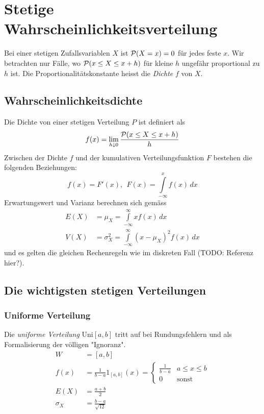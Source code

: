\chapter{Stetige Wahrscheinlichkeitsverteilung}
Bei einer stetigen Zufallsvariablen $X$ ist $\mathcal P(X=x)=0$ für jedes feste $x$. Wir betrachten nur Fälle, wo $\mathcal P(x\leq X\leq x+h)$ für kleine $h$ ungefähr proportional zu $h$ ist. Die Proportionalitätskonstante heisst die \emph{Dichte} $f$ von $X$.
%
\section{Wahrscheinlichkeitsdichte}
Die Dichte von einer stetigen Verteilung $P$ ist definiert als
\begin{equation}
	f(x) = \lim\limits_{h\downarrow 0}\frac{\mathcal P(x\leq X\leq x+h)}{h}
\end{equation}
Zwischen der Dichte $f$ und der kumulativen Verteilungsfunktion $F$ bestehen die folgenden Beziehungen:
\begin{equation}
	f(x) = F'(x), \ \ F(x) = \int\limits_{-\infty}^x f(x) \, dx
\end{equation}
Erwartungswert und Varianz berechnen sich gemäss
\begin{align}
	E(X) &= \mu_X = \int\limits_{-\infty}^\infty xf(x)\,dx \\
	V(X) &= \sigma^2_X = \int\limits_{-\infty}^\infty (x-\mu_X)^2f(x)\,dx
\end{align}
und es gelten die gleichen Rechenregeln wie im diskreten Fall (TODO: Referenz hier?).
%
\section{Die wichtigsten stetigen Verteilungen}
\subsection{Uniforme Verteilung}
Die \emph{uniforme Verteilung} $\text{Uni}[a,b]$ tritt auf bei Rundungsfehlern und als Formalisierung der völligen "Ignoranz".
\begin{align}
	W&=[a,b]\\
	f(x)&=\frac{1}{b-a}1_{[a,b]}(x)=
	\begin{cases}
		\frac{1}{b-a} & a\leq x \leq b \\
		0 & \text{sonst}
	\end{cases}\\
	E(X)&=\frac{a+b}{2}\\
	\sigma_X&=\frac{b-a}{\sqrt{12}}
\end{align}
%
